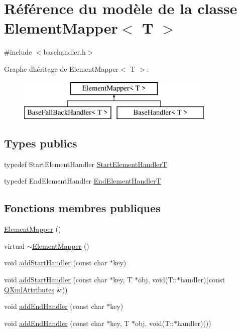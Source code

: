 \hypertarget{class_element_mapper}{}\section{Référence du modèle de la classe Element\+Mapper$<$ T $>$}
\label{class_element_mapper}


{\ttfamily \#include $<$basehandler.\+h$>$}

Graphe d\textquotesingle{}héritage de Element\+Mapper$<$ T $>$\+:\begin{figure}[H]
\begin{center}
\leavevmode
\includegraphics[height=2.000000cm]{class_element_mapper}
\end{center}
\end{figure}
\subsection*{Types publics}
\begin{DoxyCompactItemize}
\item 
typedef Start\+Element\+Handler \hyperlink{class_element_mapper_afca37050650c0a9d475f4c87b9189eac}{Start\+Element\+Handler\+T}
\item 
typedef End\+Element\+Handler \hyperlink{class_element_mapper_a3d3ef233834e26837676018b71f5d1aa}{End\+Element\+Handler\+T}
\end{DoxyCompactItemize}
\subsection*{Fonctions membres publiques}
\begin{DoxyCompactItemize}
\item 
\hyperlink{class_element_mapper_a577e0935c5a56e7769cf629ee034bf58}{Element\+Mapper} ()
\item 
virtual \hyperlink{class_element_mapper_a2f6b4b87896a63625671dcb473048650}{$\sim$\+Element\+Mapper} ()
\item 
void \hyperlink{class_element_mapper_a8cb3260e99bb20970dd7a295d5553b70}{add\+Start\+Handler} (const char $\ast$key)
\item 
void \hyperlink{class_element_mapper_a3dee79deae8ce5172e558679385032ed}{add\+Start\+Handler} (const char $\ast$key, T $\ast$obj, void(T\+::$\ast$handler)(const \hyperlink{class_q_xml_attributes}{Q\+Xml\+Attributes} \&))
\item 
void \hyperlink{class_element_mapper_accc283d02d0481be43a98662006ca80a}{add\+End\+Handler} (const char $\ast$key)
\item 
void \hyperlink{class_element_mapper_a7d2ce3844784f2040576adbdfe55068d}{add\+End\+Handler} (const char $\ast$key, T $\ast$obj, void(T\+::$\ast$handler)())
\end{DoxyCompactItemize}
